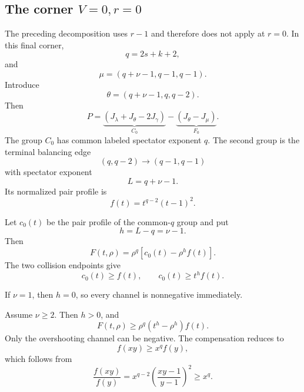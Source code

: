 \documentclass[11pt]{article}
\theoremstyle{definition}
\begin{document}
\subsection{The corner \texorpdfstring{\(V=0,r=0\)}{V = 0, r = 0}}

The preceding decomposition uses \(r-1\) and therefore does not apply at \(r=0\).  In this final corner,
\begin{equation*}
q=2s+k+2,
\end{equation*}
and
\begin{equation*}
\mu=(q+\nu-1,q-1,q-1).
\end{equation*}
Introduce
\begin{equation*}
\theta=(q+\nu-1,q,q-2).
\end{equation*}
Then
\begin{equation*}
P
=
\underbrace{(J_\lambda+J_\theta-2J_\gamma)}_{C_0}
-
\underbrace{(J_\theta-J_\mu)}_{F_0}.
\end{equation*}
The group \(C_0\) has common labeled spectator exponent \(q\).  The second group is the terminal balancing edge
\begin{equation*}
(q,q-2)\longrightarrow(q-1,q-1)
\end{equation*}
with spectator exponent
\begin{equation*}
L=q+\nu-1.
\end{equation*}
Its normalized pair profile is
\begin{equation*}
f(t)=t^{q-2}(t-1)^2.
\end{equation*}

Let \(c_0(t)\) be the pair profile of the common-\(q\) group and put
\begin{equation*}
h=L-q=\nu-1.
\end{equation*}
Then
\begin{equation*}
F(t,\rho)
=
\rho^q
\left[
c_0(t)-\rho^h f(t)
\right].
\end{equation*}
The two collision endpoints give
\begin{equation*}
c_0(t)\ge f(t),
\qquad
c_0(t)\ge t^h f(t).
\end{equation*}

If \(\nu=1\), then \(h=0\), so every channel is nonnegative immediately.

Assume \(\nu\ge2\).  Then \(h>0\), and
\begin{equation*}
F(t,\rho)
\ge
\rho^q(t^h-\rho^h)f(t).
\end{equation*}
Only the overshooting channel can be negative.  The compensation reduces to
\begin{equation*}
f(xy)\ge x^qf(y),
\end{equation*}
which follows from
\begin{equation*}
\frac{f(xy)}{f(y)}
=
x^{q-2}
\left(
\frac{xy-1}{y-1}
\right)^2
\ge x^q.
\end{equation*}
\end{document}
